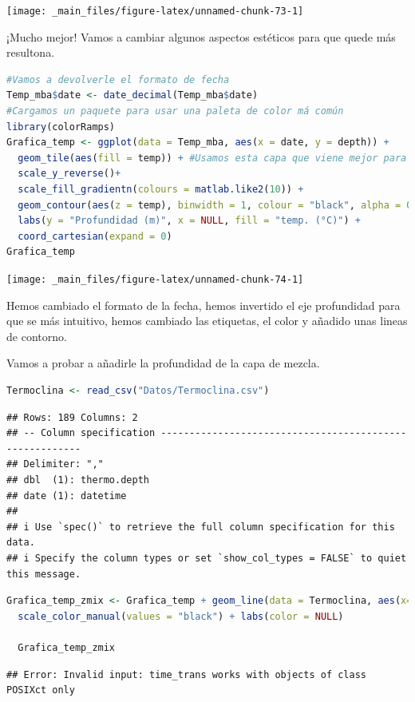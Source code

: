 \documentclass[
]{book}
\begin{document}
\texttt{[image: \_main\_files/figure-latex/unnamed-chunk-73-1]}

¡Mucho mejor! Vamos a cambiar algunos aspectos estéticos para que quede más resultona.

\begin{lstlisting}[language=R]
#Vamos a devolverle el formato de fecha
Temp_mba$date <- date_decimal(Temp_mba$date)
#Cargamos un paquete para usar una paleta de color má común
library(colorRamps)
Grafica_temp <- ggplot(data = Temp_mba, aes(x = date, y = depth)) +
  geom_tile(aes(fill = temp)) + #Usamos esta capa que viene mejor para este tipo de gráficos pero podíamos haber usado geom_point
  scale_y_reverse()+
  scale_fill_gradientn(colours = matlab.like2(10)) +
  geom_contour(aes(z = temp), binwidth = 1, colour = "black", alpha = 0.2) +
  labs(y = "Profundidad (m)", x = NULL, fill = "temp. (°C)") +
  coord_cartesian(expand = 0)
Grafica_temp
\end{lstlisting}

\texttt{[image: \_main\_files/figure-latex/unnamed-chunk-74-1]}

Hemos cambiado el formato de la fecha, hemos invertido el eje profundidad para que se más intuitivo, hemos cambiado las etiquetas, el color y añadido unas lineas de contorno.

Vamos a probar a añadirle la profundidad de la capa de mezcla.

\begin{lstlisting}[language=R]
Termoclina <- read_csv("Datos/Termoclina.csv")
\end{lstlisting}

\begin{lstlisting}
## Rows: 189 Columns: 2
## -- Column specification --------------------------------------------------------
## Delimiter: ","
## dbl  (1): thermo.depth
## date (1): datetime
## 
## i Use `spec()` to retrieve the full column specification for this data.
## i Specify the column types or set `show_col_types = FALSE` to quiet this message.
\end{lstlisting}

\begin{lstlisting}[language=R]
  Grafica_temp_zmix <- Grafica_temp + geom_line(data = Termoclina, aes(x=datetime, y = thermo.depth, color = "Termoclina"), size = 0.2)+
  scale_color_manual(values = "black") + labs(color = NULL)
  
  Grafica_temp_zmix
\end{lstlisting}

\begin{lstlisting}
## Error: Invalid input: time_trans works with objects of class POSIXct only
\end{lstlisting}
\end{document}
